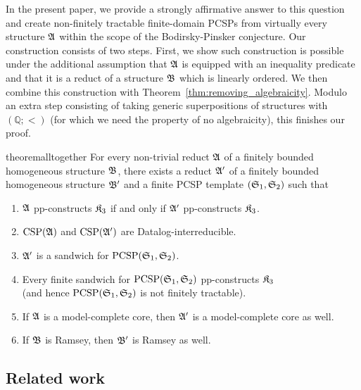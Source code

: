 In the present paper, we provide a strongly affirmative answer to this question and create non-finitely tractable finite-domain PCSPs from virtually every structure $\mathfrak{A}$ within the scope of the Bodirsky-Pinsker conjecture. Our construction consists of two steps. 
%
First, we show such construction is possible under the additional assumption that $\mathfrak{A}$ is equipped with an inequality predicate and that it is a reduct of a structure $\mathfrak{B}$ which is linearly ordered. 
%
We then combine this construction  with Theorem~\ref{thm:removing_algebraicity}.
%
Modulo an extra step consisting of taking generic superpositions of structures with $(\mathbb{Q};<)$ (for which we need the property of no algebraicity), this finishes our proof. 

\begin{restatable}{theorem}{alltogether} \label{thm:main_theorem_sandwiches}  
 For every non-trivial reduct $\mathfrak{A}$ of a finitely bounded homogeneous structure $\mathfrak{B}$, there exists a reduct $\mathfrak{A}'$ of a finitely bounded homogeneous structure $\mathfrak{B}'$ and a finite PCSP template $(\mathfrak{S}_1,\mathfrak{S}_2)$
   such that 
\begin{enumerate} 
   \item \label{item:all1} $\mathfrak{A}$ pp-constructs $\mathfrak{K}_3$ if and only if  $\mathfrak{A}'$ pp-constructs $\mathfrak{K}_3$. 
   \item \label{item:all2} $\mathrm{CSP}(\mathfrak{A})$ and $\mathrm{CSP}(\mathfrak{A}')$ are Datalog-interreducible.
      \item \label{item:all3} $\mathfrak{A}'$ is a sandwich for $\mathrm{PCSP}(\mathfrak{S}_1,\mathfrak{S}_2)$.
        \item \label{item:all4} %
        Every finite sandwich for $\mathrm{PCSP}(\mathfrak{S}_1,\mathfrak{S}_2)$ pp-constructs $\mathfrak{K}_3$\\ (and hence $\mathrm{PCSP}(\mathfrak{S}_1,\mathfrak{S}_2)$ is not finitely tractable). 
        \item \label{item:all5} If $\mathfrak{A}$ is a model-complete core, then $\mathfrak{A}'$ is a model-complete core as well.
        \item \label{item:all6} If $\mathfrak{B}$ is Ramsey, then $\mathfrak{B}'$ is Ramsey as well.
   \end{enumerate} 
   
 \end{restatable}
%
  
\subsection{Related work}\label{subsect:relatedwork}
 
